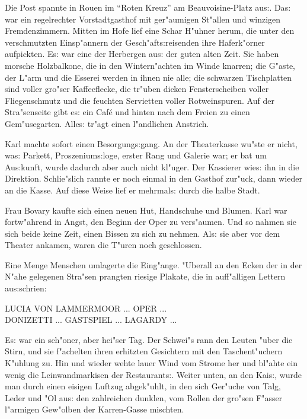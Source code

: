 \documentclass[oneside,12pt]{book}
\newenvironment{antiqua}{\normalfont}{}%
\newcommand{\s}{s:}%
\begin{document}
Die Post spannte in Rouen im "`Roten Kreuz"' am Beauvoisine-Platz
au{\s}. Da{\s} war ein regelrechter Vorstadtgasthof mit
ger"aumigen St"allen und winzigen Fremdenzimmern. Mitten im Hofe
lief eine Schar H"uhner herum, die unter den verschmutzten
Einsp"annern der Gesch"aft{\s}reisenden ihre Haferk"orner
aufpickten. E{\s} war eine der Herbergen au{\s} der guten alten
Zeit. Sie haben morsche Holzbalkone, die in den Wintern"achten im
Winde knarren; die G"aste, der L"arm und die Esserei werden in
ihnen nie alle; die schwarzen Tischplatten sind voller gro"ser
Kaffeeflecke, die tr"uben dicken Fensterscheiben voller
Fliegenschmutz und die feuchten Servietten voller Rotweinspuren.
Auf der Stra"senseite gibt e{\s} ein Caf\'e und hinten nach dem
Freien zu einen Gem"usegarten. Alle{\s} tr"agt einen l"andlichen
Anstrich.

Karl machte sofort einen Besorgung{\s}gang. An der Theaterkasse
wu"ste er nicht, wa{\s} Parkett, Pros\/zenium{\s}loge, erster Rang
und Galerie war; er bat um Au{\s}kunft, wurde dadurch aber auch
nicht kl"uger. Der Kassierer wie{\s} ihn in die Direktion.
Schlie"slich rannte er noch einmal in den Gasthof zur"uck, dann
wieder an die Kasse. Auf diese Weise lief er mehrmal{\s} durch die
halbe Stadt.

Frau Bovary kaufte sich einen neuen Hut, Handschuhe und Blumen.
Karl war fortw"ahrend in Angst, den Beginn der Oper zu vers"aumen.
Und so nahmen sie sich beide keine Zeit, einen Bissen zu sich zu
nehmen. Al{\s} sie aber vor dem Theater ankamen, waren die T"uren
noch geschlossen.


\newpage\begin{center}
{\large \so{F"unfzehnte{\s} Kapitel}}\bigskip\bigskip
\end{center}

Eine Menge Menschen umlagerte die Eing"ange. "Uberall an den Ecken
der in der N"ahe gelegenen Stra"sen prangten riesige Plakate, die
in auff"alligen Lettern au{\s}schrien:

\begin{center}
\begin{antiqua}
LUCIA VON LAMMERMOOR ... OPER ... \\
DONIZETTI ... GASTSPIEL ... LAGARDY ...
\end{antiqua}
\end{center}

E{\s} war ein sch"oner, aber hei"ser Tag. Der Schwei"s rann den
Leuten "uber die Stirn, und sie f"achelten ihren erhitzten
Gesichtern mit den Taschent"uchern K"uhlung zu. Hin und wieder
wehte lauer Wind vom Strome her und bl"ahte ein wenig die
Leinwandmarkisen der Restaurant{\s}. Weiter unten, an den Kai{\s},
wurde man durch einen eisigen Luft\/zug abgek"uhlt, in den sich
Ger"uche von Talg, Leder und "Ol au{\s} den zahlreichen dunklen,
vom Rollen der gro"sen F"asser l"armigen Gew"olben der
Karren-Gasse mischten.
\end{document}
